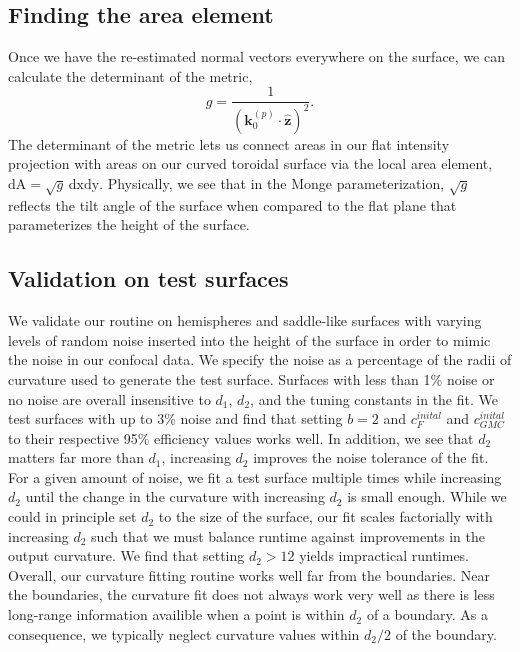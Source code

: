 \subsection{Finding the area element}
Once we have the re-estimated normal vectors everywhere on the surface, we can calculate the determinant of the metric,
\begin{equation}
g = \frac{1}{(\mathbf{k}_0^{(p)} \cdot \mathbf{\hat{z}})^2}.
\end{equation}
The determinant of the metric lets us connect areas in our flat intensity projection with areas on our curved toroidal surface via the local area element, $\textrm{dA} = \sqrt{g} \, \textrm{dx}\textrm{dy}$.
Physically, we see that in the Monge parameterization, $\sqrt{g}$ reflects the tilt angle of the surface when compared to the flat plane that parameterizes the height of the surface.


\subsection{Validation on test surfaces}
We validate our routine on hemispheres and saddle-like surfaces with varying levels of random noise inserted into the height of the surface in order to mimic the noise in our confocal data.
We specify the noise as a percentage of the radii of curvature used to generate the test surface.
Surfaces with less than 1\% noise or no noise are overall insensitive to $d_1$, $d_2$, and the tuning constants in the fit.
We test surfaces with up to 3\% noise and find that setting $b=2$ and $c_{F}^{inital}$ and $c_{GMC}^{inital}$ to their respective 95\% efficiency values works well.
In addition, we see that $d_2$ matters far more than $d_1$, increasing $d_2$ improves the noise tolerance of the fit.
For a given amount of noise, we fit a test surface multiple times while increasing $d_2$ until the change in the curvature with increasing $d_2$ is small enough.
While we could in principle set $d_2$ to the size of the surface, our fit scales factorially with increasing $d_2$ such that we must balance runtime against improvements in the output curvature.
We find that setting $d_2 > 12$ yields impractical runtimes.\\

Overall, our curvature fitting routine works well far from the boundaries.
Near the boundaries, the curvature fit does not always work very well as there is less long-range information availible when a point is within $d_2$ of a boundary.
As a consequence, we typically neglect curvature values within $d_2/2$ of the boundary.


